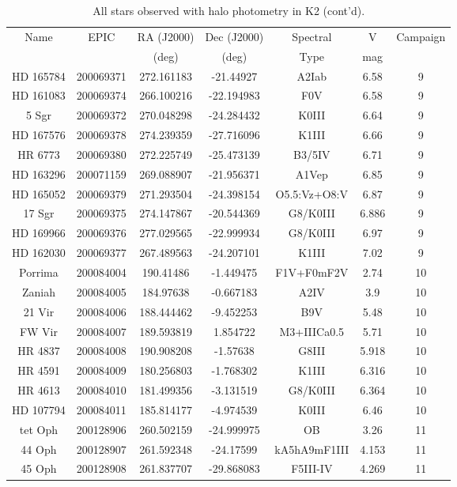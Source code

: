 \begin{table*}
\caption{All stars observed with halo photometry in K2 (cont'd).}
\begin{tabular}{ccccccc}
\hline \hline
Name & EPIC & RA (J2000) & Dec (J2000) & Spectral & V & Campaign \\
 &  & (deg) & (deg) & Type & mag &  \\
\hline
HD 165784 & 200069371 & 272.161183 & -21.44927 & A2Iab & 6.58 & 9 \\
HD 161083 & 200069374 & 266.100216 & -22.194983 & F0V & 6.58 & 9 \\
5 Sgr & 200069372 & 270.048298 & -24.284432 & K0III & 6.64 & 9 \\
HD 167576 & 200069378 & 274.239359 & -27.716096 & K1III & 6.66 & 9 \\
HR 6773 & 200069380 & 272.225749 & -25.473139 & B3/5IV & 6.71 & 9 \\
HD 163296 & 200071159 & 269.088907 & -21.956371 & A1Vep & 6.85 & 9 \\
HD 165052 & 200069379 & 271.293504 & -24.398154 & O5.5:Vz+O8:V & 6.87 & 9 \\
17 Sgr & 200069375 & 274.147867 & -20.544369 & G8/K0III & 6.886 & 9 \\
HD 169966 & 200069376 & 277.029565 & -22.999934 & G8/K0III & 6.97 & 9 \\
HD 162030 & 200069377 & 267.489563 & -24.207101 & K1III & 7.02 & 9 \\
Porrima & 200084004 & 190.41486 & -1.449475 & F1V+F0mF2V & 2.74 & 10 \\
Zaniah & 200084005 & 184.97638 & -0.667183 & A2IV & 3.9 & 10 \\
21 Vir & 200084006 & 188.444462 & -9.452253 & B9V & 5.48 & 10 \\
FW Vir & 200084007 & 189.593819 & 1.854722 & M3+IIICa0.5 & 5.71 & 10 \\
HR 4837 & 200084008 & 190.908208 & -1.57638 & G8III & 5.918 & 10 \\
HR 4591 & 200084009 & 180.256803 & -1.768302 & K1III & 6.316 & 10 \\
HR 4613 & 200084010 & 181.499356 & -3.131519 & G8/K0III & 6.364 & 10 \\
HD 107794 & 200084011 & 185.814177 & -4.974539 & K0III & 6.46 & 10 \\
tet Oph & 200128906 & 260.502159 & -24.999975 & OB & 3.26 & 11 \\
44 Oph & 200128907 & 261.592348 & -24.17599 & kA5hA9mF1III & 4.153 & 11 \\
45 Oph & 200128908 & 261.837707 & -29.868083 & F5III-IV & 4.269 & 11 \\

\end{tabular}
\end{table*}
